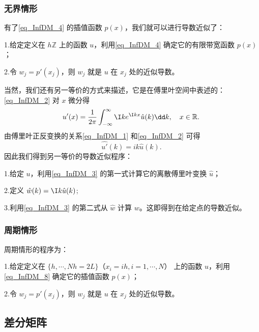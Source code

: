 \subsubsection{无界情形}
有了\autoref{eq_InfDM_4} 的插值函数 $p(x)$，我们就可以进行导数近似了：

1.给定定义在 $h\mathbb Z$ 上的函数 $u$，利用\autoref{eq_InfDM_4} 确定它的有限带宽函数 $p(x)$；

2.令 $w_j=p'(x_j)$，则 $w_j$ 就是 $u$ 在 $x_j$ 处的近似导数。

当然，我们还有另一等价的方式来描述，它是在傅里叶空间中表述的：\autoref{eq_InfDM_2}  对 $x$ 微分得
\begin{equation}
u'(x)=\frac{1}{2\pi}\int_{-\infty}^{\infty} \I ke^{\I kx}\hat u(k)\dd k,\quad x\in \mathbb R.~
\end{equation}
由傅里叶正反变换的关系\autoref{eq_InfDM_1} 和\autoref{eq_InfDM_2} 可得
\begin{equation}
\hat{u'}(k)=ik\hat u(k).~
\end{equation}
因此我们得到另一等价的导数近似程序：

1.给定 $u$，利用\autoref{eq_InfDM_3} 的第一式计算它的离散傅里叶变换 $\hat u$；

2.定义 $\hat w(k)=\I k\hat u(k)$;

3.利用\autoref{eq_InfDM_3} 的第二式从 $\hat w$ 计算 $w$。这即得到在给定点的导数近似。
\subsubsection{周期情形}
周期情形的程序为：

1.给定定义在 $\{h,\cdots,Nh=2L\}$（$x_i=ih,i=1,\cdots,N$） 上的函数 $u$，利用\autoref{eq_InfDM_8} 确定它的插值函数 $p(x)$；

2.令 $w_j=p'(x_j)$，则 $w_j$ 就是 $u$ 在 $x_j$ 处的近似导数。


\subsection{差分矩阵}
